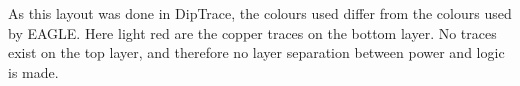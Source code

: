 As this layout was done in DipTrace,
the colours used differ from the colours used by EAGLE.
Here light red are the copper traces on the bottom layer.
No traces exist on the top layer,
and therefore no layer separation between power and logic is made.

